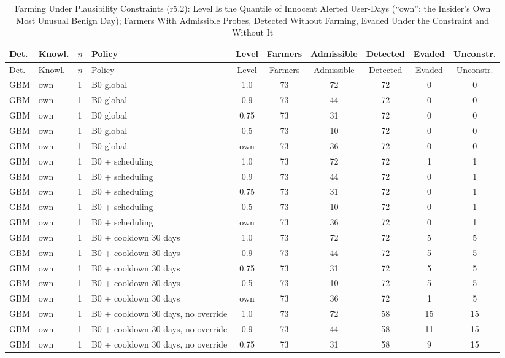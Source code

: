 \documentclass[10pt,onecolumn,letterpaper]{article}
\begin{document}
\begin{longtable}{lllp{4.4cm}cccccc}
\caption{Farming Under Plausibility Constraints (r5.2): Level Is the Quantile of Innocent Alerted User-Days (``own'': the Insider's Own Most Unusual Benign Day); Farmers With Admissible Probes, Detected Without Farming, Evaded Under the Constraint and Without It\label{tab:e-m2-r52}}\\
\toprule
Det. & Knowl. & $n$ & Policy & Level & Farmers & Admissible & Detected & Evaded & Unconstr. \\
\midrule
\endfirsthead
\toprule
Det. & Knowl. & $n$ & Policy & Level & Farmers & Admissible & Detected & Evaded & Unconstr. \\
\midrule
\endhead
GBM & own & 1 & B0 global & 1.0 & 73 & 72 & 72 & 0 & 0 \\
GBM & own & 1 & B0 global & 0.9 & 73 & 44 & 72 & 0 & 0 \\
GBM & own & 1 & B0 global & 0.75 & 73 & 31 & 72 & 0 & 0 \\
GBM & own & 1 & B0 global & 0.5 & 73 & 10 & 72 & 0 & 0 \\
GBM & own & 1 & B0 global & own & 73 & 36 & 72 & 0 & 0 \\
GBM & own & 1 & B0 + scheduling & 1.0 & 73 & 72 & 72 & 1 & 1 \\
GBM & own & 1 & B0 + scheduling & 0.9 & 73 & 44 & 72 & 0 & 1 \\
GBM & own & 1 & B0 + scheduling & 0.75 & 73 & 31 & 72 & 0 & 1 \\
GBM & own & 1 & B0 + scheduling & 0.5 & 73 & 10 & 72 & 0 & 1 \\
GBM & own & 1 & B0 + scheduling & own & 73 & 36 & 72 & 0 & 1 \\
GBM & own & 1 & B0 + cooldown 30 days & 1.0 & 73 & 72 & 72 & 5 & 5 \\
GBM & own & 1 & B0 + cooldown 30 days & 0.9 & 73 & 44 & 72 & 5 & 5 \\
GBM & own & 1 & B0 + cooldown 30 days & 0.75 & 73 & 31 & 72 & 5 & 5 \\
GBM & own & 1 & B0 + cooldown 30 days & 0.5 & 73 & 10 & 72 & 5 & 5 \\
GBM & own & 1 & B0 + cooldown 30 days & own & 73 & 36 & 72 & 1 & 5 \\
GBM & own & 1 & B0 + cooldown 30 days, no override & 1.0 & 73 & 72 & 58 & 15 & 15 \\
GBM & own & 1 & B0 + cooldown 30 days, no override & 0.9 & 73 & 44 & 58 & 11 & 15 \\
GBM & own & 1 & B0 + cooldown 30 days, no override & 0.75 & 73 & 31 & 58 & 9 & 15 \\

\end{longtable}
\end{document}
